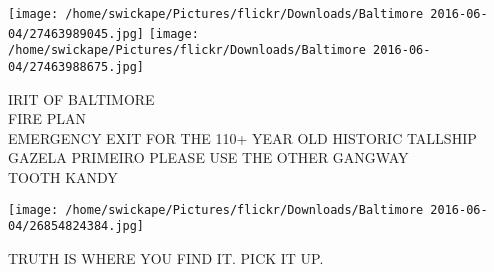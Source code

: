 \documentclass[10pt,letterpaper]{article}
\begin{document}
\texttt{[image: /home/swickape/Pictures/flickr/Downloads/Baltimore 2016-06-04/27463989045.jpg]}
\texttt{[image: /home/swickape/Pictures/flickr/Downloads/Baltimore 2016-06-04/27463988675.jpg]}

IRIT OF BALTIMORE\\
FIRE PLAN\\
EMERGENCY EXIT FOR THE 110+ YEAR OLD HISTORIC TALLSHIP GAZELA PRIMEIRO PLEASE USE THE OTHER GANGWAY\\
TOOTH KANDY
\pagebreak

\texttt{[image: /home/swickape/Pictures/flickr/Downloads/Baltimore 2016-06-04/26854824384.jpg]}

TRUTH IS WHERE YOU FIND IT.  PICK IT UP.
\pagebreak
\end{document}
